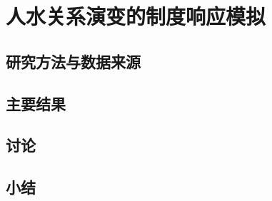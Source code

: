 \chapter{人水关系演变的制度响应模拟}


\section{研究方法与数据来源}


\section{主要结果}\label{ch6:results}


\section{讨论}\label{ch6:discussion}


\section{小结}\label{ch6:summary}

